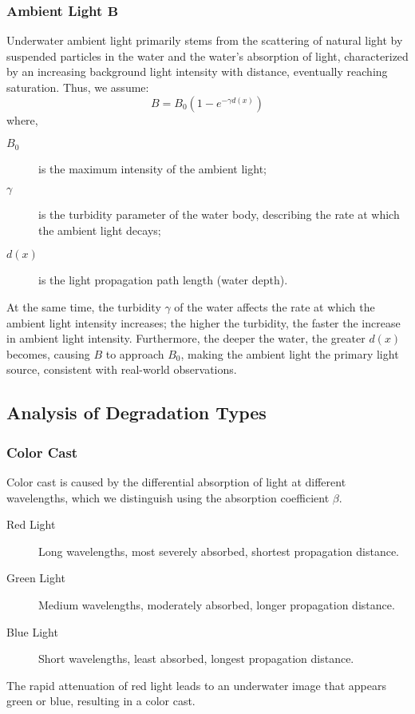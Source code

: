 \documentclass[11pt]{ctexart}
\begin{document}
    \subsubsection{Ambient Light \( \boldsymbol{B} \)}
    Underwater ambient light primarily stems from the scattering of natural light by suspended particles in the water and the water's absorption of light, characterized by an increasing background light intensity with distance, eventually reaching saturation.
    Thus, we assume:
    \[ B = B_0(1 - e^{-\gamma d(x)}) \]
    where,
    \begin{description}
        \item [$B_0$] is the maximum intensity of the ambient light;
        \item [$\gamma$] is the turbidity parameter of the water body, describing the rate at which the ambient light decays;
        \item [$d(x)$] is the light propagation path length (water depth).
    \end{description}
    At the same time, the turbidity \( \gamma \) of the water affects the rate at which the ambient light intensity increases; the higher the turbidity, the faster the increase in ambient light intensity.
    Furthermore, the deeper the water, the greater \( d(x) \) becomes, causing \( B \) to approach \( B_0 \), making the ambient light the primary light source, consistent with real-world observations.

    \subsection{Analysis of Degradation Types}
    \subsubsection{Color Cast}
    Color cast is caused by the differential absorption of light at different wavelengths, which we distinguish using the absorption coefficient \( \beta \).
    \begin{description}
        \item [Red Light] Long wavelengths, most severely absorbed, shortest propagation distance.
        \item [Green Light] Medium wavelengths, moderately absorbed, longer propagation distance.
        \item [Blue Light] Short wavelengths, least absorbed, longest propagation distance.
    \end{description}
    The rapid attenuation of red light leads to an underwater image that appears green or blue, resulting in a color cast.
\end{document}

